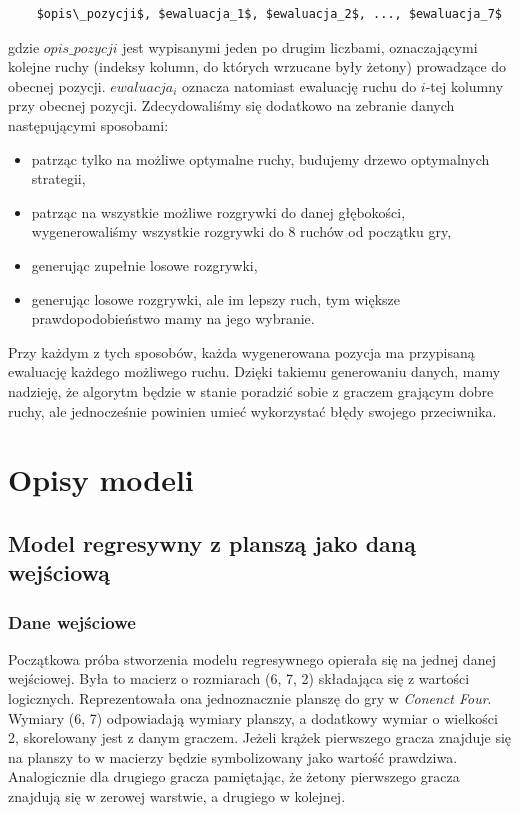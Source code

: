 \documentclass[12pt]{article}
\begin{document}
\begin{lstlisting}
    $opis\_pozycji$, $ewaluacja_1$, $ewaluacja_2$, ..., $ewaluacja_7$
\end{lstlisting}


gdzie $opis\_pozycji$ jest wypisanymi jeden po drugim liczbami, oznaczającymi kolejne ruchy (indeksy kolumn, do których wrzucane były żetony) prowadzące do obecnej pozycji. $ewaluacja_i$ oznacza natomiast ewaluację ruchu do $i$-tej kolumny przy obecnej pozycji. Zdecydowaliśmy się dodatkowo na zebranie danych następującymi sposobami:

\begin{itemize}
    \item patrząc tylko na możliwe optymalne ruchy, budujemy drzewo optymalnych strategii,
    \item patrząc na wszystkie możliwe rozgrywki do danej głębokości, wygenerowaliśmy wszystkie rozgrywki do 8 ruchów od początku gry,
    \item generując zupełnie losowe rozgrywki,
    \item generując losowe rozgrywki, ale im lepszy ruch, tym większe prawdopodobieństwo mamy na jego wybranie.
\end{itemize}

Przy każdym z tych sposobów, każda wygenerowana pozycja ma przypisaną ewaluację każdego możliwego ruchu. Dzięki takiemu generowaniu danych, mamy nadzieję, że algorytm będzie w stanie poradzić sobie z graczem grającym dobre ruchy, ale jednocześnie powinien umieć wykorzystać błędy swojego przeciwnika.

\section{Opisy modeli}

\subsection{Model regresywny z planszą jako daną wejściową}

\subsubsection{Dane wejściowe}

Początkowa próba stworzenia modelu regresywnego opierała się na jednej danej wejściowej. Była to macierz o rozmiarach (6, 7, 2) składająca się z wartości logicznych. Reprezentowała ona jednoznacznie planszę do gry w \textit{Conenct Four}. Wymiary (6, 7) odpowiadają wymiary planszy, a dodatkowy wymiar o wielkości 2, skorelowany jest z danym graczem. Jeżeli krążek pierwszego gracza znajduje się na planszy to w macierzy będzie symbolizowany jako wartość prawdziwa. Analogicznie dla drugiego gracza pamiętając, że żetony pierwszego gracza znajdują się w zerowej warstwie, a drugiego w kolejnej.
\end{document}
